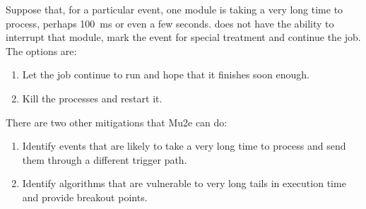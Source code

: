 Suppose that, for a particular event, one module is taking a very long time to process,
perhaps 100~ms or even a few seconds.  \art does not have the ability to interrupt
that module, mark the event for special treatment and continue the job.  The options are:

\begin{enumerate}
  \item Let the job continue to run and hope that it finishes soon enough.
  \item Kill the processes and restart it.
\end{enumerate}

There are two other mitigations that Mu2e can do:
\begin{enumerate}
  \item Identify events that are likely to take a very long time to process and send them through a different trigger path.
  \item Identify algorithms that are vulnerable to very long tails in execution time and provide breakout points.
\end{enumerate}

